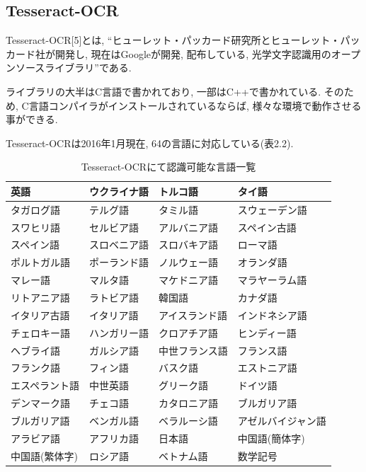 \subsection{Tesseract-OCR}
Tesseract-OCR[5]とは, “ヒューレット・パッカード研究所とヒューレット・パッカード社が開発し, 現在はGoogleが開発, 配布している, 光学文字認識用のオープンソースライブラリ”である.

ライブラリの大半はC言語で書かれており, 一部はC++で書かれている.
そのため, C言語コンパイラがインストールされているならば, 様々な環境で動作させる事ができる.

Tesseract-OCRは2016年1月現在, 64の言語に対応している(表2.2).

\begin{table}[tb]
\begin{center}
\begin{tabular}{|p{3.5cm}|p{3.5cm}|p{3.5cm}|p{3.5cm}|} \hline
英語 & ウクライナ語 & トルコ語 & タイ語 \\ \hline
タガログ語 & テルグ語 & タミル語 & スウェーデン語 \\ \hline
スワヒリ語 & セルビア語 & アルバニア語 & スペイン古語 \\ \hline
スペイン語 & スロベニア語 & スロバキア語 & ローマ語 \\ \hline
ポルトガル語 & ポーランド語 & ノルウェー語 & オランダ語 \\ \hline
マレー語 & マルタ語 & マケドニア語 & マラヤーラム語 \\ \hline
リトアニア語 & ラトビア語 & 韓国語 & カナダ語 \\ \hline
イタリア古語 & イタリア語 & アイスランド語 & インドネシア語 \\ \hline
チェロキー語 & ハンガリー語 & クロアチア語 & ヒンディー語 \\ \hline
ヘブライ語 & ガルシア語 & 中世フランス語 & フランス語 \\ \hline
フランク語 & フィン語 & バスク語 & エストニア語 \\ \hline
エスペラント語 & 中世英語 & グリーク語 & ドイツ語 \\ \hline
デンマーク語 & チェコ語 & カタロニア語 & ブルガリア語 \\ \hline
ブルガリア語 & ベンガル語 & ベラルーシ語 & アゼルバイジャン語 \\ \hline
アラビア語 & アフリカ語 & 日本語 & 中国語(簡体字) \\ \hline
中国語(繁体字) & ロシア語 & ベトナム語 & 数学記号 \\ \hline
\end{tabular}
\caption{Tesseract-OCRにて認識可能な言語一覧}
\end{center}
\end{table}

